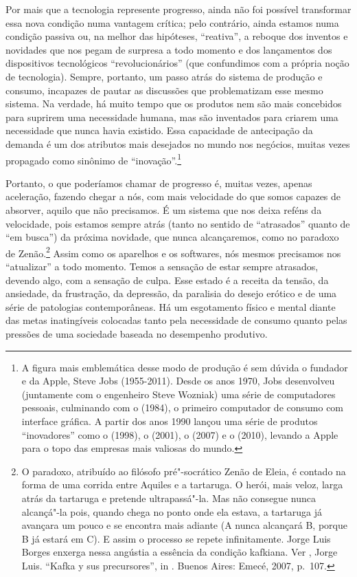 Por mais que a tecnologia represente progresso, ainda não foi possível
transformar essa nova condição numa vantagem crítica; pelo contrário,
ainda estamos numa condição passiva ou, na melhor das hipóteses,
``reativa'', a reboque dos inventos e novidades que nos pegam de
surpresa a todo momento e dos lançamentos dos dispositivos tecnológicos
``revolucionários'' (que confundimos com a própria noção de tecnologia).
Sempre, portanto, um passo atrás do sistema de produção e consumo,
incapazes de pautar as discussões que problematizam esse mesmo sistema.
Na verdade, há muito tempo que os produtos nem são mais concebidos para
suprirem uma necessidade humana, mas são inventados para criarem uma
necessidade que nunca havia existido. Essa capacidade de antecipação da
demanda é um dos atributos mais desejados no mundo nos negócios, muitas
vezes propagado como sinônimo de ``inovação''.\footnote{A figura mais
  emblemática desse modo de produção é sem dúvida o fundador e  da
  Apple, Steve Jobs (1955-2011). Desde os anos 1970, Jobs desenvolveu
  (juntamente com o engenheiro Steve Wozniak) uma série de computadores
  pessoais, culminando com o {} (1984), o primeiro
  computador de consumo com interface gráfica. A partir dos anos 1990
  lançou uma série de produtos ``inovadores'' como o {} (1998),
  o {} (2001), o {} (2007) e o {} (2010),
  levando a Apple para o topo das empresas mais valiosas do mundo.}

Portanto, o que poderíamos chamar de progresso é, muitas vezes, apenas
aceleração, fazendo chegar a nós, com mais velocidade do que somos
capazes de absorver, aquilo que não precisamos. É um sistema que nos
deixa reféns da velocidade, pois estamos sempre atrás (tanto no
sentido de ``atrasados'' quanto de ``em busca'') da próxima novidade,
que nunca alcançaremos, como no paradoxo de Zenão.\footnote{O paradoxo,
  atribuído ao filósofo pré"-socrático Zenão de Eleia, é contado na forma
  de uma corrida entre Aquiles e a tartaruga. O herói, mais veloz, larga
  atrás da tartaruga e pretende ultrapassá"-la. Mas não consegue nunca
  alcançá"-la pois, quando chega no ponto onde ela estava, a tartaruga já
  avançara um pouco e se encontra mais adiante (A nunca alcançará B,
  porque B já estará em C). E assim o processo se repete infinitamente.
  Jorge Luis Borges enxerga nessa angústia a essência da condição
  kafkiana. Ver , Jorge Luis. ``Kafka y sus precursores'', in
  {}. Buenos Aires: Emecé, 2007, p.~107.} Assim como os aparelhos e os softwares, nós mesmos precisamos
nos ``atualizar'' a todo momento. Temos a sensação de estar
sempre atrasados, devendo algo, com a sensação de culpa. Esse estado é a
receita da tensão, da ansiedade, da frustração, da depressão, da
paralisia do desejo erótico e de uma série de patologias contemporâneas.
Há um esgotamento físico e mental diante das metas inatingíveis
colocadas tanto pela necessidade de consumo quanto pelas pressões de uma
sociedade baseada no desempenho produtivo.

